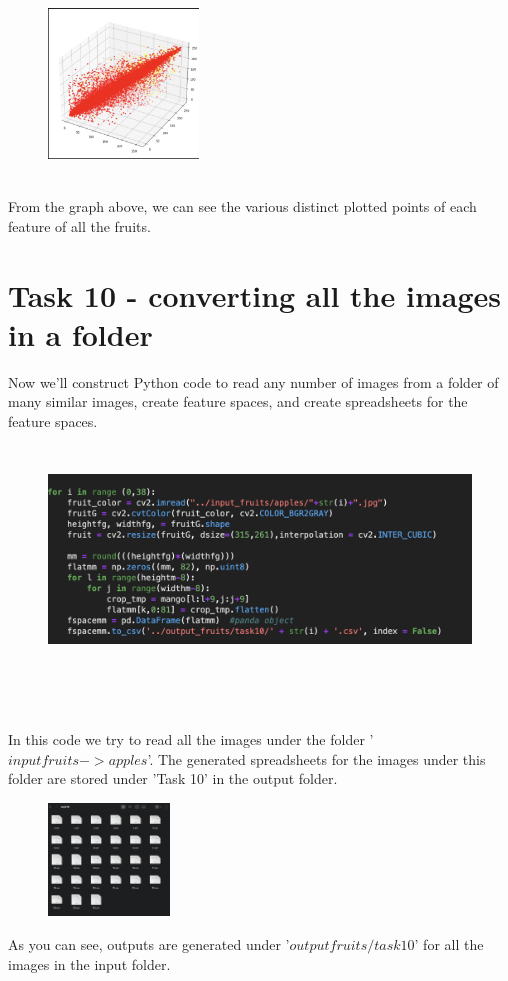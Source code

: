 \documentclass[conference]{IEEEtran}
\begin{document}
\begin{figure}[!htbp]
    \centering
    \includegraphics[height=4cm]{Task9-3d.png} 
   
    \label{fig:my_label}
\end{figure}
\\From the graph above, we can see the various distinct plotted points of each feature of all the fruits. \\

\section{Task 10 - converting all the images in a folder}
Now we'll construct Python code to read any number of images from a folder of many similar images, create feature spaces, and create spreadsheets for the feature spaces.
\begin{figure}[!htbp]
    \centering
    \includegraphics[height=6cm]{task10-code.png} 
   
    \label{fig:my_label}
\end{figure}
\\\\In this code we try to read all the images under the folder '$input fruits->apples$'. The generated spreadsheets for the images under this folder are stored under 'Task 10' in the output folder.
\begin{figure}[!htbp]
    \centering
    \includegraphics[height=3cm]{output.png} 
   
    \label{fig:my_label}
\end{figure}
As you can see, outputs are generated under '$output fruits/task10$' for all the images in the input folder.
\end{document}
